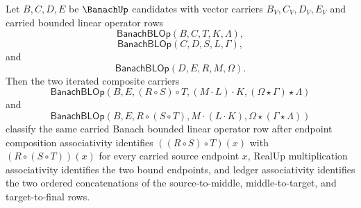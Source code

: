 \begin{theorem}
\label{thm:banach-bounded-linear-operator-composition-associative}
Let $B,C,D,E$ be $\BanachUp$ candidates with vector carriers
$B_V,C_V,D_V,E_V$ and carried bounded linear operator rows
$$
\mathsf{BanachBLOp}(B,C,T,K,\Lambda),
$$
$$
\mathsf{BanachBLOp}(C,D,S,L,\Gamma),
$$
and
$$
\mathsf{BanachBLOp}(D,E,R,M,\Omega).
$$
Then the two iterated composite carriers
$$
\mathsf{BanachBLOp}(B,E,(R\circ S)\circ T,(M\cdot L)\cdot K,
(\Omega\star\Gamma)\star\Lambda)
$$
and
$$
\mathsf{BanachBLOp}(B,E,R\circ(S\circ T),M\cdot(L\cdot K),
\Omega\star(\Gamma\star\Lambda))
$$
classify the same carried Banach bounded linear operator row after endpoint
composition associativity identifies $((R\circ S)\circ T)(x)$ with
$(R\circ(S\circ T))(x)$ for every carried source endpoint $x$, RealUp
multiplication associativity identifies the two bound endpoints, and ledger
associativity identifies the two ordered concatenations of the
source-to-middle, middle-to-target, and target-to-final rows.
\end{theorem}
